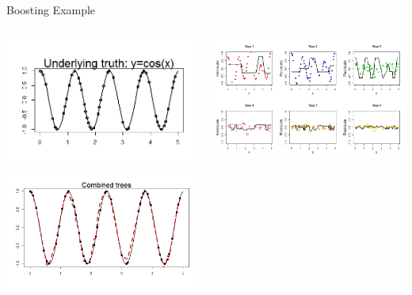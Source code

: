 \documentclass{beamer}
\begin{document}
	\begin{frame}{Boosting Example}
		\begin{columns}
			\begin{column}{0.5\textwidth}
					\includegraphics[scale=0.35]{data.jpeg}\\
					\includegraphics[scale=0.35]{combine.jpeg}\\
			\end{column}
			\begin{column}{0.6\textwidth}
				\includegraphics[scale=0.365]{boostex.jpeg}
			\end{column}
		\end{columns}
	\end{frame}
	
\end{document}
